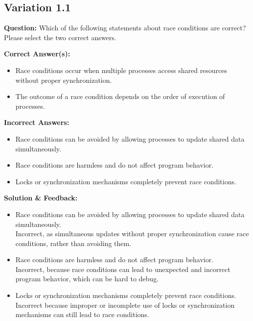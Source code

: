 \subsection{Variation 1.1}
\textbf{Question:} Which of the following statements about race conditions are correct? Please select the two correct answers.

\textbf{Correct Answer(s):}
\begin{itemize}
    \item Race conditions occur when multiple processes access shared resources without proper synchronization. 
    \item The outcome of a race condition depends on the order of execution of processes. 
\end{itemize}

\textbf{Incorrect Answers:}
\begin{itemize}
    \item Race conditions can be avoided by allowing processes to update shared data simultaneously. 
    \item Race conditions are harmless and do not affect program behavior. 
    \item Locks or synchronization mechanisms completely prevent race conditions. 
\end{itemize}

\textbf{Solution \& Feedback:}
\begin{itemize}
    \item Race conditions can be avoided by allowing processes to update shared data simultaneously.\\
    Incorrect, as simultaneous updates without proper synchronization cause race conditions, rather than avoiding them. 
    \item Race conditions are harmless and do not affect program behavior. \\
    Incorrect, because race conditions can lead to unexpected and incorrect program behavior, which can be hard to debug. 
    \item Locks or synchronization mechanisms completely prevent race conditions. \\
    Incorrect because improper or incomplete use of locks or synchronization mechanisms can still lead to race conditions. 
\end{itemize}
